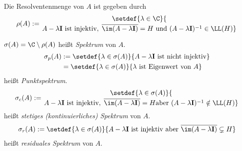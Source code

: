 \begin{defn}
\label{defn:8.13}
\begin{defnenum}
\item Die Resolventenmenge von $A$ ist gegeben durch
\begin{align*}
\rho(A) := \setdef{\lambda\in\C}{\atop{A-\lambda\Id \text{ ist injektiv},\;
\overline{\im(A-\lambda\Id)}=H}{\text{ und }(A-\lambda\Id)^{-1}\in\LL(H)}}
\end{align*}
\item $\sigma(A) =\C\setminus \rho(A)$ heißt \emph{Spektrum}
von $A$.
\begin{align*}
\sigma_p(A) &:= \setdef{\lambda\in \sigma(A)}{A-\lambda\Id\text{ ist
nicht injektiv}}\\ &= \setdef{\lambda\in\sigma(A)}{\lambda\text{ ist Eigenwert
von } A}
\end{align*}
heißt \emph{Punktspektrum}.
\begin{align*}
\sigma_c(A) := \setdef{\lambda\in\sigma(A)}{\atop{A-\lambda\Id\text{ ist
injektiv},\;
\overline{\im(A-\lambda\Id)}=H}{\text{aber }(A-\lambda\Id)^{-1}\notin\LL(H)}}
\end{align*}
heißt \emph{stetiges (kontinuierliches)
Spektrum} von $A$.
\begin{align*}
\sigma_r(A) := \setdef{\lambda\in\sigma(A)}{A-\lambda\Id\text{ ist injektiv
aber }\overline{\im(A-\lambda\Id)}\subsetneq H}
\end{align*}
heißt \emph{residuales Spektrum} von $A$.\fishhere
\end{defnenum}
\end{defn}

